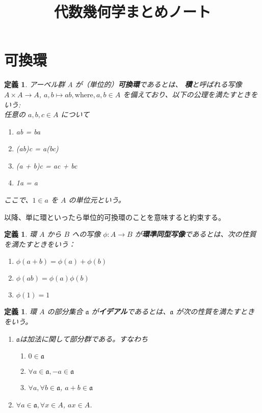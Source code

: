 \documentclass[uplatex, 12pt]{jsreport}
\title{代数幾何学まとめノート}
\date{}
\newtheorem{dfn}[thm]{定義}
\newcommand{\mfa}{\mathfrak{a}}
\begin{document}
\maketitle

\section{可換環}
\begin{dfn}
アーベル群 A が（単位的）\textbf{可換環}であるとは、
\textbf{積}と呼ばれる写像 $A \times A \to A$, $a, b \mapsto ab, \text{where}, a, b \in A$
を備えており、以下の公理を満たすときをいう: \\

任意の $a, b, c \in A$ について
\begin{enumerate}
    \item ab = ba
    \item (ab)c = a(bc)
    \item (a + b)c = ac + bc
    \item 1a = a
\end{enumerate}
ここで、$1 \in a$ を $A$ の単位元という。
\end{dfn}
以降、単に環といったら単位的可換環のことを意味すると約束する。

\begin{dfn}
    環 $A$ から $B$ への写像 $\phi: A \to B$ が\textbf{環準同型写像}であるとは、次の性質を満たすときをいう：
    \begin{enumerate}
        \item $\phi(a + b) = \phi(a) + \phi(b)$
        \item $\phi(ab) = \phi(a)\phi(b)$
        \item $\phi(1) = 1$
    \end{enumerate}
\end{dfn}

\begin{dfn}
    環 $A$ の部分集合 $\mfa$ が\textbf{イデアル}であるとは、$\mfa$ が次の性質を満たすときをいう。
    \begin{enumerate}
        \item $\mfa$は加法に関して部分群である。すなわち
        \begin{enumerate}
            \item $0 \in \mfa$
            \item $\forall a \in \mfa, -a \in \mfa$
            \item $\forall a, \forall b \in \mfa$, $a + b \in \mfa$
        \end{enumerate}
        \item $\forall a \in \mfa, \forall x \in A$, $ax \in A$.
    \end{enumerate}
\end{dfn}
\end{document}
